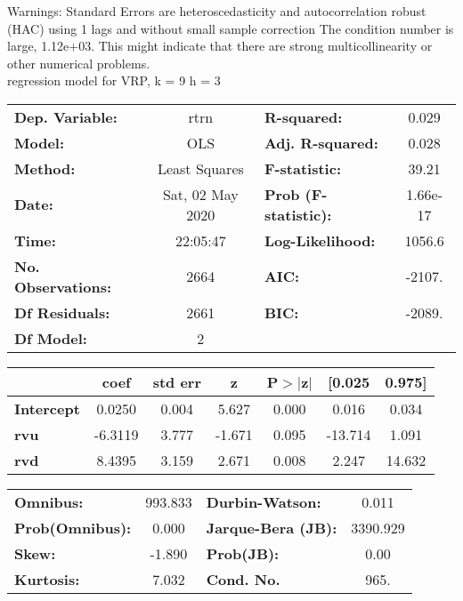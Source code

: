 Warnings: \newline
 [1] Standard Errors are heteroscedasticity and autocorrelation robust (HAC) using 1 lags and without small sample correction \newline
 [2] The condition number is large, 1.12e+03. This might indicate that there are \newline
 strong multicollinearity or other numerical problems.\\ 

regression model for VRP, k = 9 h = 3\begin{center}
\begin{tabular}{lclc}
\toprule
\textbf{Dep. Variable:}    &       rtrn       & \textbf{  R-squared:         } &     0.029   \\
\textbf{Model:}            &       OLS        & \textbf{  Adj. R-squared:    } &     0.028   \\
\textbf{Method:}           &  Least Squares   & \textbf{  F-statistic:       } &     39.21   \\
\textbf{Date:}             & Sat, 02 May 2020 & \textbf{  Prob (F-statistic):} &  1.66e-17   \\
\textbf{Time:}             &     22:05:47     & \textbf{  Log-Likelihood:    } &    1056.6   \\
\textbf{No. Observations:} &        2664      & \textbf{  AIC:               } &    -2107.   \\
\textbf{Df Residuals:}     &        2661      & \textbf{  BIC:               } &    -2089.   \\
\textbf{Df Model:}         &           2      & \textbf{                     } &             \\
\bottomrule
\end{tabular}
\begin{tabular}{lcccccc}
                   & \textbf{coef} & \textbf{std err} & \textbf{z} & \textbf{P$> |$z$|$} & \textbf{[0.025} & \textbf{0.975]}  \\
\midrule
\textbf{Intercept} &       0.0250  &        0.004     &     5.627  &         0.000        &        0.016    &        0.034     \\
\textbf{rvu}       &      -6.3119  &        3.777     &    -1.671  &         0.095        &      -13.714    &        1.091     \\
\textbf{rvd}       &       8.4395  &        3.159     &     2.671  &         0.008        &        2.247    &       14.632     \\
\bottomrule
\end{tabular}
\begin{tabular}{lclc}
\textbf{Omnibus:}       & 993.833 & \textbf{  Durbin-Watson:     } &    0.011  \\
\textbf{Prob(Omnibus):} &   0.000 & \textbf{  Jarque-Bera (JB):  } & 3390.929  \\
\textbf{Skew:}          &  -1.890 & \textbf{  Prob(JB):          } &     0.00  \\
\textbf{Kurtosis:}      &   7.032 & \textbf{  Cond. No.          } &     965.  \\
\bottomrule
\end{tabular}
\end{center}

